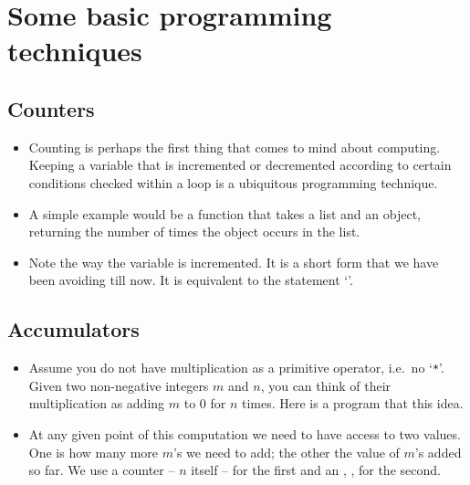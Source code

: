 \documentclass[a4paper]{article}
\begin{document}
\section{Some basic programming techniques} {

\subsection{Counters} 

\begin{itemize}

\item Counting is perhaps the first thing that comes to mind about computing.
Keeping a variable that is incremented or decremented according to certain
conditions checked within a loop is a ubiquitous programming technique. 

\item A simple example would be a function that takes a list and an object,
returning the number of times the object occurs in the list.


\item Note the way the  variable is incremented. It is a short
form that we have been avoiding till now. It is equivalent to the statement `'. 

\end{itemize}

\subsection{Accumulators}

\begin{itemize}

\item Assume you do not have multiplication as a primitive operator, i.e.\ no
`\Verb+*+'.  Given two non-negative integers $m$ and $n$, you can think of their
multiplication as adding $m$ to 0 for $n$ times. Here is a program that
 this idea.     

\item At any given point of this computation we need to have access to two values.
One is how many more $m$'s we need to add; the other the value of $m$'s added so far.  
We use a counter -- $n$ itself -- for the first and an ,
, for the second.


\end{itemize}}
\end{document}
